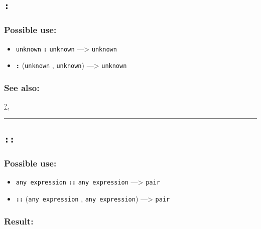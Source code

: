 \documentclass[]{book}
\providecommand{\tightlist}{%
  \setlength{\itemsep}{0pt}\setlength{\parskip}{0pt}}
\theoremstyle{definition}
\theoremstyle{definition}
\theoremstyle{definition}
\theoremstyle{remark}
\begin{document}
\subsection{\texorpdfstring{\texttt{:}}{:}}\label{section-2}

\subsubsection{Possible use:}\label{possible-use-1}

\begin{itemize}
\tightlist
\item
  \texttt{unknown} \textbf{\texttt{:}} \texttt{unknown}
  ---\textgreater{} \texttt{unknown}
\item
  \textbf{\texttt{:}} (\texttt{unknown} , \texttt{unknown})
  ---\textgreater{} \texttt{unknown}
\end{itemize}

\subsubsection{See also:}\label{see-also-1}

\href{OperatorsAA\#?}{?},

\begin{center}\rule{0.5\linewidth}{\linethickness}\end{center}

\subsection{\texorpdfstring{\texttt{::}}{::}}\label{section-3}

\subsubsection{Possible use:}\label{possible-use-2}

\begin{itemize}
\tightlist
\item
  \texttt{any\ expression} \textbf{\texttt{::}} \texttt{any\ expression}
  ---\textgreater{} \texttt{pair}
\item
  \textbf{\texttt{::}} (\texttt{any\ expression} ,
  \texttt{any\ expression}) ---\textgreater{} \texttt{pair}
\end{itemize}

\subsubsection{Result:}\label{result-1}
\end{document}
